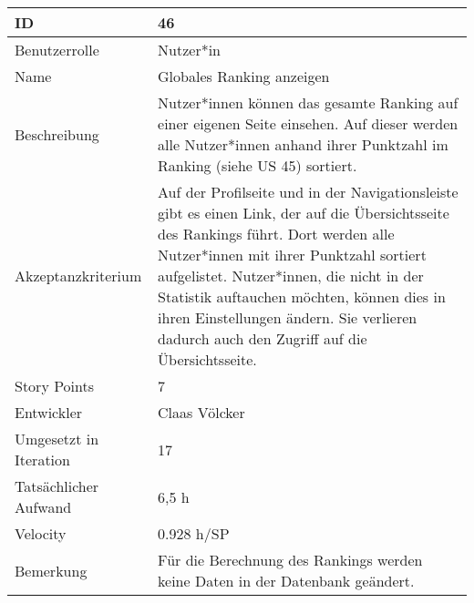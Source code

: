 \begin{tabularx}{\textwidth}{|p{}|X|}
	\hline
	ID & 46\\
	\hline
	Benutzerrolle & Nutzer*in\\
	\hline
	Name & Globales Ranking anzeigen\\
	\hline
	Beschreibung & Nutzer*innen können das gesamte Ranking auf einer eigenen Seite einsehen. Auf dieser werden alle Nutzer*innen anhand ihrer Punktzahl im Ranking (siehe US 45) sortiert.\\
	\hline
	Akzeptanzkriterium & Auf der Profilseite und in der Navigationsleiste gibt es einen Link, der auf die Übersichtsseite des Rankings führt. Dort werden alle Nutzer*innen mit ihrer Punktzahl sortiert aufgelistet. Nutzer*innen, die nicht in der Statistik auftauchen möchten, können dies in ihren Einstellungen ändern. Sie verlieren dadurch auch den Zugriff auf die Übersichtsseite.\\
	\hline
	Story Points & 7\\
	\hline
	Entwickler & Claas Völcker\\
	\hline
	Umgesetzt in Iteration & 17\\
	\hline
	Tatsächlicher Aufwand & 6,5 h\\
	\hline
	Velocity & 0.928 h/SP\\
	\hline
	Bemerkung & Für die Berechnung des Rankings werden keine Daten in der Datenbank geändert.\\
	\hline
\end{tabularx}
\vspace{20pt}
